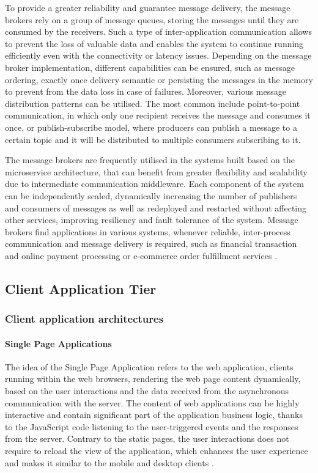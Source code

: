To provide a greater reliability and guarantee message delivery, the message brokers rely on a group of message queues, storing the messages until they are consumed by the receivers. Such a type of inter-application communication allows to prevent the loss of valuable data and enables the system to continue running efficiently even with the connectivity or latency issues. Depending on the message broker implementation, different capabilities can be ensured, such as message ordering, exactly once delivery semantic or persisting the messages in the memory to prevent from the data loss in case of failures.
Moreover, various message distribution patterns can be utilised. The most common include point-to-point communication, in which only one recipient receives the message and consumes it once, or publish-subscribe model, where producers can publish a message to a certain topic and it will be distributed to multiple consumers subscribing to it.

The message brokers are frequently utilised in the systems built based on the microservice architecture, that can benefit from greater flexibility and scalability due to intermediate communication middleware. Each component of the system can be independently scaled, dynamically increasing the number of publishers and consumers of messages as well as redeployed and restarted without affecting other services, improving resiliency and fault tolerance of the system. Message brokers find applications in various systems, whenever reliable, inter-process communication and message delivery is required, such as financial transaction and online payment processing or e-commerce order fulfillment services \cite{MessageBrokers}.

\subsection{Client Application Tier}

\subsubsection{Client application architectures}

\paragraph{Single Page Applications}

The idea of the Single Page Application \cite{SPA} refers to the web application, clients running within the web browsers, rendering the web page content dynamically, based on the user interactions and the data received from the asynchronous communication with the server. The content of web applications can be highly interactive and contain significant part of the application business logic, thanks to the JavaScript code listening to the user-triggered events and the responses from the server.
Contrary to the static pages, the user interactions does not require to reload the view of the application, which enhances the user experience and makes it similar to the mobile and desktop clients \cite{PerspectivesOnArchitectureEvolution}.

